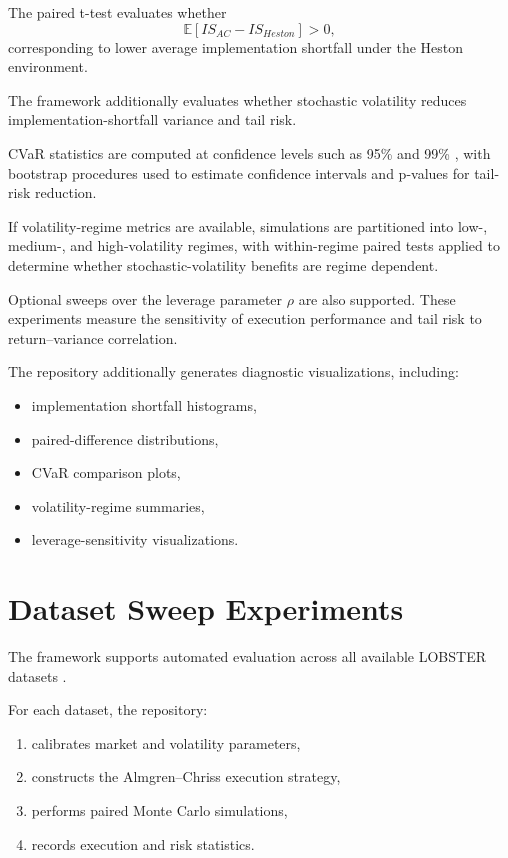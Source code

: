 \documentclass[11pt]{article}
\begin{document}
The paired t-test evaluates whether
\[
\mathbb E[IS_{AC}-IS_{Heston}] > 0,
\]
corresponding to lower average implementation shortfall under the Heston environment.

The framework additionally evaluates whether stochastic volatility reduces implementation-shortfall variance and tail risk.

CVaR statistics are computed at confidence levels such as 95\% and 99\% \cite{rockafellar2000cvar}, with bootstrap procedures \cite{efron1993bootstrap} used to estimate confidence intervals and p-values for tail-risk reduction.

If volatility-regime metrics are available, simulations are partitioned into low-, medium-, and high-volatility regimes, with within-regime paired tests applied to determine whether stochastic-volatility benefits are regime dependent.

Optional sweeps over the leverage parameter $\rho$ are also supported. These experiments measure the sensitivity of execution performance and tail risk to return--variance correlation.

The repository additionally generates diagnostic visualizations, including:
\begin{itemize}
\item implementation shortfall histograms,
\item paired-difference distributions,
\item CVaR comparison plots,
\item volatility-regime summaries,
\item leverage-sensitivity visualizations.
\end{itemize}

\section{Dataset Sweep Experiments}

The framework supports automated evaluation across all available LOBSTER datasets \cite{huang2011lobster}.

For each dataset, the repository:
\begin{enumerate}
\item calibrates market and volatility parameters,
\item constructs the Almgren--Chriss execution strategy,
\item performs paired Monte Carlo simulations,
\item records execution and risk statistics.
\end{enumerate}
\end{document}
